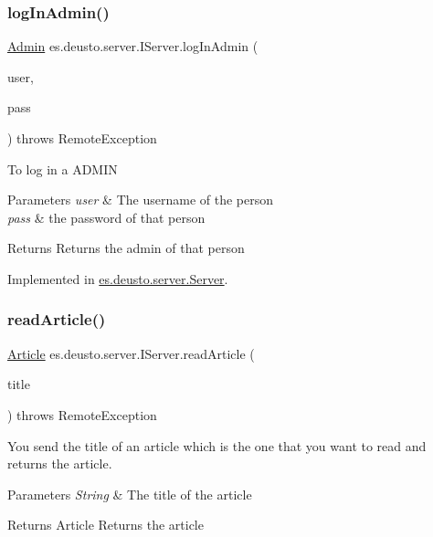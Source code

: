 \subsubsection{\texorpdfstring{log\+In\+Admin()}{logInAdmin()}}
{\footnotesize\ttfamily \hyperlink{classes_1_1deusto_1_1server_1_1jdo_1_1_admin}{Admin} es.\+deusto.\+server.\+I\+Server.\+log\+In\+Admin (\begin{DoxyParamCaption}\item[{String}]{user,  }\item[{String}]{pass }\end{DoxyParamCaption}) throws Remote\+Exception}

To log in a A\+D\+M\+IN


\begin{DoxyParams}{Parameters}
{\em user} & The username of the person \\
\hline
{\em pass} & the password of that person \\
\hline
\end{DoxyParams}
\begin{DoxyReturn}{Returns}
Returns the admin of that person 
\end{DoxyReturn}


Implemented in \hyperlink{classes_1_1deusto_1_1server_1_1_server_a654d408d0865f8e3f2c931da9e90283a}{es.\+deusto.\+server.\+Server}.

\mbox{\label{interfacees_1_1deusto_1_1server_1_1_i_server_a1f02a5aa0628909b5464141923f5d1d2}} 
\subsubsection{\texorpdfstring{read\+Article()}{readArticle()}}
{\footnotesize\ttfamily \hyperlink{classes_1_1deusto_1_1server_1_1jdo_1_1_article}{Article} es.\+deusto.\+server.\+I\+Server.\+read\+Article (\begin{DoxyParamCaption}\item[{String}]{title }\end{DoxyParamCaption}) throws Remote\+Exception}

You send the title of an article which is the one that you want to read and returns the article. 
\begin{DoxyParams}{Parameters}
{\em String} & The title of the article \\
\hline
\end{DoxyParams}
\begin{DoxyReturn}{Returns}
Article Returns the article 
\end{DoxyReturn}


